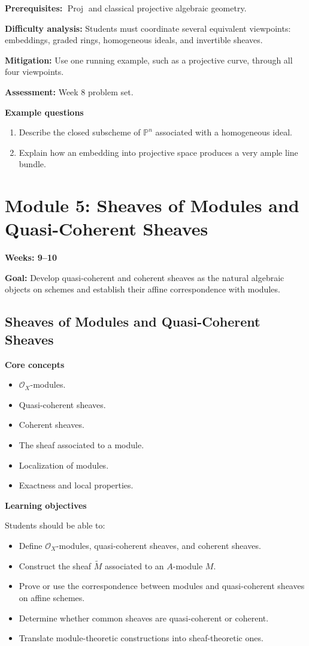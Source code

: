 \documentclass[11pt]{article}
\begin{document}
\textbf{Prerequisites:} $\operatorname{Proj}$ and classical projective algebraic geometry.

\textbf{Difficulty analysis:} Students must coordinate several equivalent viewpoints: embeddings, graded rings, homogeneous ideals, and invertible sheaves.

\textbf{Mitigation:} Use one running example, such as a projective curve, through all four viewpoints.

\textbf{Assessment:} Week 8 problem set.

\textbf{Example questions}
\begin{enumerate}
    \item Describe the closed subscheme of $\mathbb{P}^n$ associated with a homogeneous ideal.
    \item Explain how an embedding into projective space produces a very ample line bundle.
\end{enumerate}

\section{Module 5: Sheaves of Modules and Quasi-Coherent Sheaves}

\textbf{Weeks: 9--10}

\textbf{Goal:} Develop quasi-coherent and coherent sheaves as the natural algebraic objects on schemes and establish their affine correspondence with modules.

\subsection{Sheaves of Modules and Quasi-Coherent Sheaves}

\textbf{Core concepts}
\begin{itemize}
    \item $\mathcal{O}_X$-modules.
    \item Quasi-coherent sheaves.
    \item Coherent sheaves.
    \item The sheaf associated to a module.
    \item Localization of modules.
    \item Exactness and local properties.
\end{itemize}

\textbf{Learning objectives}

Students should be able to:
\begin{itemize}
    \item Define $\mathcal{O}_X$-modules, quasi-coherent sheaves, and coherent sheaves.
    \item Construct the sheaf $\widetilde{M}$ associated to an $A$-module $M$.
    \item Prove or use the correspondence between modules and quasi-coherent sheaves on affine schemes.
    \item Determine whether common sheaves are quasi-coherent or coherent.
    \item Translate module-theoretic constructions into sheaf-theoretic ones.
\end{itemize}
\end{document}
